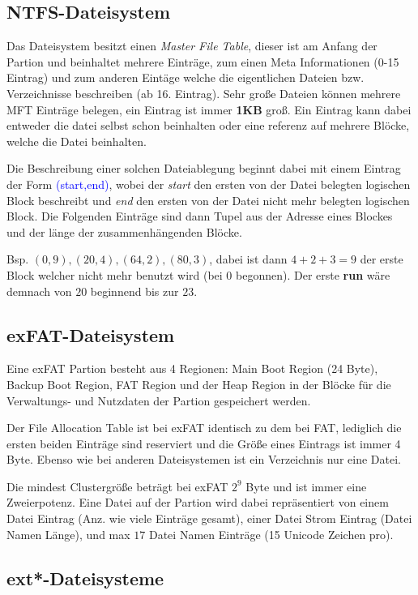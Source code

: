 \documentclass[10pt,a4paper]{article}
\begin{document}
\begin{multicols*}{4}
\subsection{NTFS-Dateisystem}
Das Dateisystem besitzt einen \emph{Master File Table}, dieser ist am Anfang der Partion und beinhaltet mehrere
Einträge, zum einen Meta Informationen (0-15 Eintrag) und zum anderen Eintäge welche die eigentlichen Dateien bzw.
Verzeichnisse beschreiben (ab 16. Eintrag). Sehr große Dateien können mehrere MFT Einträge belegen, ein Eintrag ist
immer \textbf{1KB} groß. Ein Eintrag kann dabei entweder die datei selbst schon beinhalten oder eine referenz auf
mehrere Blöcke, welche die Datei beinhalten.

Die Beschreibung einer solchen Dateiablegung beginnt dabei mit einem Eintrag der Form \textcolor{blue}{(start,end)},
wobei der \emph{start} den ersten von der Datei belegten logischen Block beschreibt und \emph{end} den ersten von der
Datei nicht mehr belegten logischen Block. Die Folgenden Einträge sind dann Tupel aus der Adresse eines Blockes und der
länge der zusammenhängenden Blöcke.

Bsp. \((0,9),(20,4),(64,2),(80,3)\), dabei ist dann \(4+2+3=9\) der erste Block welcher nicht mehr benutzt wird (bei
\(0\) begonnen). Der erste \textbf{run} wäre demnach von \(20\) beginnend bis zur \(23\).

\subsection{exFAT-Dateisystem}
Eine exFAT Partion besteht aus 4 Regionen: Main Boot Region (24 Byte), Backup Boot Region, FAT Region und der Heap
Region in der Blöcke für die Verwaltungs- und Nutzdaten der Partion gespeichert werden.

Der File Allocation Table ist bei exFAT identisch zu dem bei FAT, lediglich die ersten beiden Einträge sind reserviert
und die Größe eines Eintrags ist immer 4 Byte. Ebenso wie bei anderen Dateisystemen ist ein Verzeichnis nur eine Datei.

Die mindest Clustergröße beträgt bei exFAT \(2^{9}\) Byte und ist immer eine Zweierpotenz. Eine Datei auf der Partion
wird dabei repräsentiert von einem Datei Eintrag (Anz. wie viele Einträge gesamt), einer Datei Strom Eintrag
(Datei Namen Länge), und max \(17\) Datei Namen Einträge (15 Unicode Zeichen pro).

\subsection{ext*-Dateisysteme}


\end{multicols*}
\end{document}
